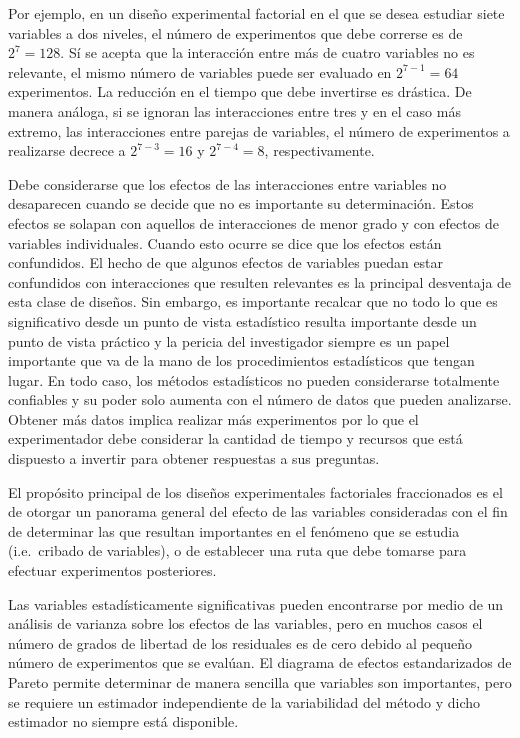 Por ejemplo, en un diseño experimental factorial en el que se desea estudiar siete variables a dos niveles, el número de experimentos que debe correrse es de $2^7=128$. Sí se acepta que la interacción entre más de cuatro variables no es relevante, el mismo número de variables puede ser evaluado en $2^{7-1}=64$ experimentos. La reducción en el tiempo que debe invertirse es drástica. De manera análoga, si se ignoran las interacciones entre tres y en el caso más extremo, las interacciones entre parejas de variables, el número de experimentos a realizarse decrece a $2^{7-3}=16$ y $2^{7-4}=8$, respectivamente. 

Debe considerarse que los efectos de las interacciones entre variables no {desaparecen} cuando se decide que no es importante su determinación. Estos efectos se solapan con aquellos de inter\-accio\-nes de menor grado y con efectos de variables individuales. Cuando esto ocurre se dice que los efectos están {confundidos}. El hecho de que algunos efectos de variables puedan estar confundidos con interacciones que resulten relevantes es la principal desventaja de esta clase de diseños. Sin embargo, es importante recalcar que no todo lo que es significativo desde un punto de vista estadístico resulta importante desde un punto de vista práctico y la pericia del investigador siempre es un papel importante que va de la mano de los procedimientos estadísticos que tengan lugar. En todo caso, los métodos estadísticos no pueden considerarse totalmente confiables y su poder solo aumenta con el número de datos que pueden analizarse. Obtener más datos implica realizar más experimentos por lo que el experimentador debe considerar la cantidad de tiempo y recursos que está dispuesto a invertir para obtener respuestas a sus preguntas.

El propósito principal de los diseños experimentales factoriales fraccionados es el de otorgar un panorama general del efecto de las variables consideradas con el fin de determinar las que resultan importantes en el fenómeno que se estudia (i.e.\ cribado de variables), o de establecer una ruta que debe tomarse para efectuar experimentos posteriores. 

Las variables estadísticamente significativas pueden encontrarse por medio de un análisis de varianza sobre los efectos de las variables, pero en muchos casos el número de grados de libertad de los residuales es de cero debido al pequeño número de experimentos que se evalúan. El diagrama de efectos estandarizados de Pareto permite determinar de manera sencilla que variables son importantes, pero se requiere un estimador independiente de la variabilidad del método y dicho estimador no siempre está disponible. 

